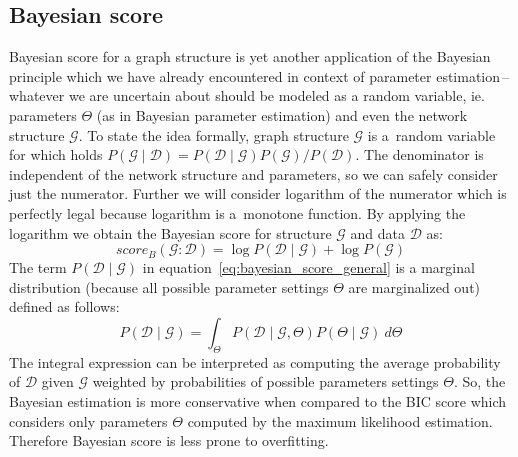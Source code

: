 \documentclass[english,cover]{fitthesis} %
\begin{document}
\subsection{Bayesian score}
Bayesian score for a graph structure is yet another application of the Bayesian principle which we have already encountered in context of parameter estimation\,--\,whatever we are uncertain about should be modeled as a random variable, ie. parameters $\Theta$ (as in Bayesian parameter estimation) and even the network structure $\mathcal{G}$. To state the idea formally, graph structure $\mathcal{G}$ is a~random variable for which holds $P(\mathcal{G} \mid \mathcal{D}) = P(\mathcal{D} \mid \mathcal{G}) P(\mathcal{G}) / P(\mathcal{D})$. The denominator is independent of the network structure and parameters, so we can safely consider just the numerator. Further we will consider logarithm of the numerator which is perfectly legal because logarithm is a~monotone function. By applying the logarithm we obtain the Bayesian score for structure $\mathcal{G}$ and data $\mathcal{D}$ as:
\begin{equation}\label{eq:bayesian_score_general}
    score_B(\mathcal{G} : \mathcal{D}) = \log P(\mathcal{D} \mid \mathcal{G}) + \log P(\mathcal{G})
\end{equation}
The term $P(\mathcal{D} \mid \mathcal{G})$ in equation~\eqref{eq:bayesian_score_general} is a marginal distribution (because all possible parameter settings $\Theta$ are marginalized out) defined as follows:
\begin{equation}\label{eq:bayesian_score_marginal}
    P(\mathcal{D} \mid \mathcal{G})
    =
    \int_{\Theta} P(\mathcal{D} \mid \mathcal{G}, \Theta) P(\Theta \mid \mathcal{G}) \ d \Theta
\end{equation}
The integral expression can be interpreted as computing the average probability of $\mathcal{D}$ given $\mathcal{G}$ weighted by probabilities of possible parameters settings $\Theta$. So, the Bayesian estimation is more conservative when compared to the BIC score which considers only parameters $\Theta$ computed by the maximum likelihood estimation. Therefore Bayesian score is less prone to overfitting.
\end{document}
